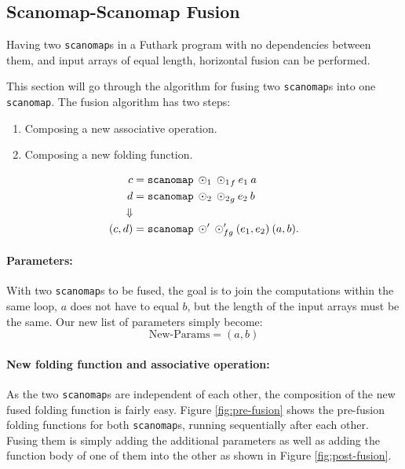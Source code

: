 \documentclass[11pt,bibliography=totocnumbered]{article}
\begin{document}
\clearpage
\subsection{Scanomap-Scanomap Fusion}
Having two \texttt{scanomap}s in a Futhark program with no dependencies between them, and input arrays of equal length, horizontal fusion can be performed.

This section will go through the algorithm for fusing two \texttt{scanomap}s into one \texttt{scanomap}. The fusion algorithm has two steps:
\begin{enumerate}
\item Composing a new associative operation.
\item Composing a new folding function.
\end{enumerate}

\begin{align*}
  c &= \mathtt{scanomap} \: \odot_1 \: {\odot_1}_f \: e_1 \: a \\
  d &= \mathtt{scanomap} \: \odot_2 \: {\odot_2}_g \: e_2 \: b \\
\Downarrow \\
  (c,d) &= \mathtt{scanomap} \: \odot' \: \odot'_{fg} \: (e_1, e_2) \: (a, b)\mathnormal{.}
\end{align*}


\paragraph{Parameters:} With two \texttt{scanomap}s to be fused, the goal is to join the computations within the same loop, $a$ does not have to equal $b$, but the length of the input arrays must be the same. Our new list of parameters simply become:
$$\text{New-Params} = (a,b)$$

\paragraph{New folding function and associative operation:} As the two \texttt{scanomap}s are independent of each other, the composition of the new fused folding function is fairly easy. Figure \ref{fig:pre-fusion} shows the pre-fusion folding functions for both \texttt{scanomap}s, running sequentially after each other. Fusing them is simply adding the additional parameters as well as adding the function body of one of them into the other as shown in Figure \ref{fig:post-fusion}. 
\end{document}
